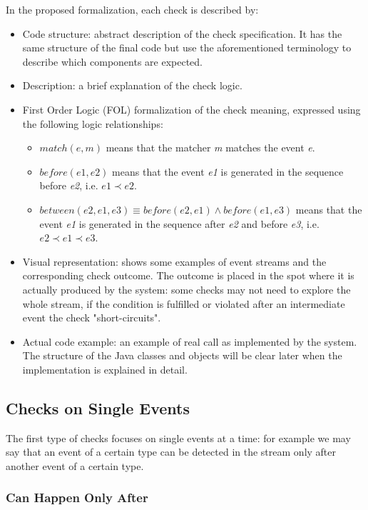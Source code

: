 \documentclass[11pt,a4paper,notitlepage]{article}
\begin{document}
In the proposed formalization, each check is described by:
\begin{itemize}
	\item Code structure: abstract description of the check specification. It has the same structure of the final code but use the aforementioned terminology to describe which components are expected.
	\item Description: a brief explanation of the check logic.
	\item First Order Logic (FOL) formalization of the check meaning, expressed using the following logic relationships:
	\begin{itemize}
		\item $match(e, m)$ means that the matcher \textit{m} matches the event \textit{e}.
		\item $before(e1, e2)$ means that the event \textit{e1} is generated in the sequence before \textit{e2}, i.e. $e1 \prec e2$.
		\item $between(e2, e1, e3) \equiv before(e2, e1) \land before(e1, e3)$ means that the event \textit{e1} is generated in the sequence after \textit{e2} and before \textit{e3}, i.e. $e2 \prec e1 \prec e3$.
	\end{itemize}
	\item Visual representation: shows some examples of event streams and the corresponding check outcome. The outcome is placed in the spot where it is actually produced by the system: some checks may not need to explore the whole stream, if the condition is fulfilled or violated after an intermediate event the check "short-circuits".
	\item Actual code example: an example of real call as implemented by the system. The structure of the Java classes and objects will be clear later when the implementation is explained in detail.
\end{itemize}


\subsection{Checks on Single Events}

The first type of checks focuses on single events at a time: for example we may say that an event of a certain type can be detected in the stream only after another event of a certain type.

\subsubsection{Can Happen Only After}
\end{document}

